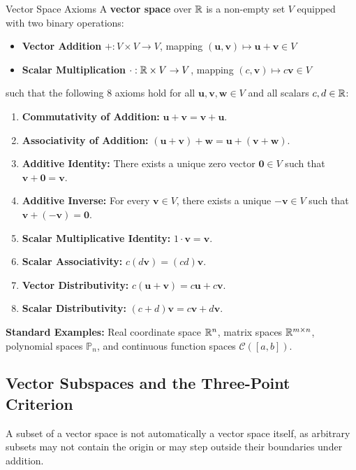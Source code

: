 \begin{definitionbox}{Vector Space Axioms}
A \textbf{vector space} over $\mathbb{R}$ is a non-empty set $V$ equipped with two binary operations:
\begin{itemize}
    \item \textbf{Vector Addition} $+: V \times V \to V$, mapping $(\mathbf{u}, \mathbf{v}) \mapsto \mathbf{u} + \mathbf{v} \in V$
    \item \textbf{Scalar Multiplication} $\cdot: \mathbb{R} \times V \to V$, mapping $(c, \mathbf{v}) \mapsto c\mathbf{v} \in V$
\end{itemize}
such that the following 8 axioms hold for all $\mathbf{u}, \mathbf{v}, \mathbf{w} \in V$ and all scalars $c, d \in \mathbb{R}$:
\begin{enumerate}
    \item \textbf{Commutativity of Addition:} $\mathbf{u} + \mathbf{v} = \mathbf{v} + \mathbf{u}$.
    \item \textbf{Associativity of Addition:} $(\mathbf{u} + \mathbf{v}) + \mathbf{w} = \mathbf{u} + (\mathbf{v} + \mathbf{w})$.
    \item \textbf{Additive Identity:} There exists a unique zero vector $\mathbf{0} \in V$ such that $\mathbf{v} + \mathbf{0} = \mathbf{v}$.
    \item \textbf{Additive Inverse:} For every $\mathbf{v} \in V$, there exists a unique $-\mathbf{v} \in V$ such that $\mathbf{v} + (-\mathbf{v}) = \mathbf{0}$.
    \item \textbf{Scalar Multiplicative Identity:} $1 \cdot \mathbf{v} = \mathbf{v}$.
    \item \textbf{Scalar Associativity:} $c(d\mathbf{v}) = (cd)\mathbf{v}$.
    \item \textbf{Vector Distributivity:} $c(\mathbf{u} + \mathbf{v}) = c\mathbf{u} + c\mathbf{v}$.
    \item \textbf{Scalar Distributivity:} $(c + d)\mathbf{v} = c\mathbf{v} + d\mathbf{v}$.
\end{enumerate}
\textbf{Standard Examples:} Real coordinate space $\mathbb{R}^n$, matrix spaces $\mathbb{R}^{m \times n}$, polynomial spaces $\mathbb{P}_n$, and continuous function spaces $\mathcal{C}([a, b])$.
\end{definitionbox}

\subsection{Vector Subspaces and the Three-Point Criterion}

A subset of a vector space is not automatically a vector space itself, as arbitrary subsets may not contain the origin or may step outside their boundaries under addition.

